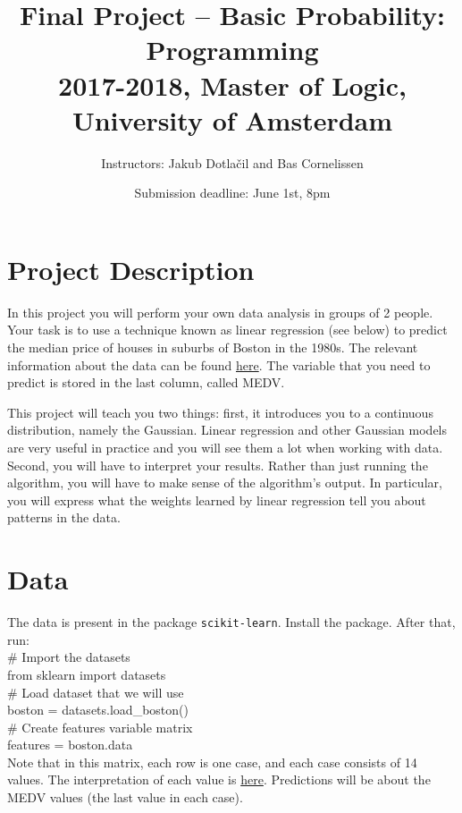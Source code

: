 \documentclass[11pt, leqno, a4paper]{article}
\title{Final Project -- Basic Probability: Programming\\[2mm]
\large{2017-2018, Master of Logic, University of Amsterdam}}
\author{Instructors: Jakub Dotla\v{c}il and Bas Cornelissen}
\date{Submission deadline: June 1st, 8pm}
\begin{document}
\maketitle

\section{Project Description}

In this project you will perform your own data analysis in groups of 2 people. Your task is
to use a technique known as linear regression (see below) to predict the median price of houses
in suburbs of Boston in the 1980s. The relevant information about the data can be found
\href{http://www.cs.toronto.edu/\%7Edelve/data/boston/bostonDetail.html}{here}. The variable that you need
to predict is stored in the last column, called MEDV.

This project will teach you two things: first, it introduces you to a continuous distribution, namely
the Gaussian. Linear regression and other Gaussian models are very useful in practice and you will
see them a lot when working with data. Second, you will have to interpret your results. Rather than
just running the algorithm, you will have to make sense of the algorithm's output. In particular, you
will express what the weights learned by linear regression tell you about patterns in the data.

\section{Data}

The data is present in the package \texttt{scikit-learn}. Install the package. After that, run:\\
\# Import the datasets\\
from sklearn import datasets\\[1em]
\# Load dataset that we will use\\
boston = datasets.load\_boston()\\[1em]
\# Create features variable matrix\\
features = boston.data\\[1em]

Note that in this matrix, each row is one case, and each case consists of 14 values. The interpretation of each value is \href{http://www.cs.toronto.edu/\%7Edelve/data/boston/bostonDetail.html}{here}. Predictions will be about the MEDV values (the last value in each case).
\end{document}
